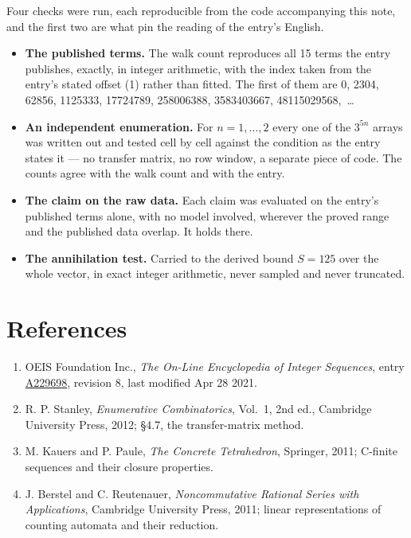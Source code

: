 \documentclass[11pt]{article}
\theoremstyle{definition}
\begin{document}
Four checks were run, each reproducible from the code accompanying this note, and the first two are what pin the reading of the entry's English.

\begin{itemize}

\item {\bfseries The published terms.} The walk count reproduces all 15 terms the entry publishes, exactly, in integer arithmetic, with the index taken from the entry's stated offset (1) rather than fitted. The first of them are 0, 2304, 62856, 1125333, 17724789, 258006388, 3583403667, 48115029568,~\dots

\item {\bfseries An independent enumeration.} For $n = 1,\dots,2$ every one of the $3^{5n}$ arrays was written out and tested cell by cell against the condition as the entry states it --- no transfer matrix, no row window, a separate piece of code. The counts agree with the walk count and with the entry.

\item {\bfseries The claim on the raw data.} Each claim was evaluated on the entry's published terms alone, with no model involved, wherever the proved range and the published data overlap. It holds there.

\item {\bfseries The annihilation test.} Carried to the derived bound $S = 125$ over the whole vector, in exact integer arithmetic, never sampled and never truncated.

\end{itemize}

\section{References}

\begin{enumerate}

\item OEIS Foundation Inc., \emph{The On-Line Encyclopedia of Integer Sequences}, entry \href{https://oeis.org/A229698}{A229698}, revision 8, last modified Apr 28 2021.

\item R. P. Stanley, \emph{Enumerative Combinatorics}, Vol.~1, 2nd ed., Cambridge University Press, 2012; \S4.7, the transfer-matrix method.

\item M. Kauers and P. Paule, \emph{The Concrete Tetrahedron}, Springer, 2011; C-finite sequences and their closure properties.

\item J. Berstel and C. Reutenauer, \emph{Noncommutative Rational Series with Applications}, Cambridge University Press, 2011; linear representations of counting automata and their reduction.

\end{enumerate}
\end{document}
